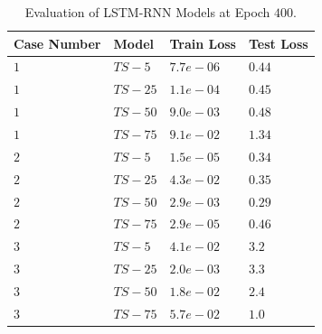 \documentclass[fleqn,10pt]{wlscirep}
\begin{document}
\begin{table}[ht]
\centering
\begin{tabular}{|l|l|l|l|}
\hline
\textbf{Case Number} & \textbf{Model} & \textbf{Train Loss} & \textbf{Test Loss}  \\
\hline
$1$ & $TS-5$ & $7.7e-06$ & $0.44$ \\
\hline
$1$ & $TS-25$ & $1.1e-04$ & $0.45$ \\
\hline
$1$ & $TS-50$ & $9.0e-03$ & $0.48$ \\
\hline
$1$ & $TS-75$ & $9.1e-02$ & $1.34$ \\
\hline
$2$ & $TS-5$ & $1.5e-05$ & $0.34$ \\
\hline
$2$ & $TS-25$ & $4.3e-02$ & $0.35$ \\
\hline
$2$ & $TS-50$ & $2.9e-03$ & $0.29$ \\
\hline
$2$ & $TS-75$ & $2.9e-05$ & $0.46$ \\
\hline
$3$ & $TS-5$ & $4.1e-02$ & $3.2$ \\
\hline
$3$ & $TS-25$ & $2.0e-03$ & $3.3$ \\
\hline
$3$ & $TS-50$ & $1.8e-02$ & $2.4$ \\
\hline
$3$ & $TS-75$ & $5.7e-02$ & $1.0$ \\
\hline
\end{tabular}
\caption{\label{tab:eval}Evaluation of LSTM-RNN Models at Epoch $400$.}
\end{table}
\end{document}
